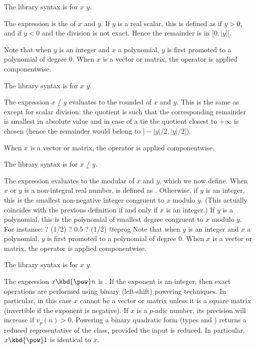The library syntax is  for $x$ \kbd{/} $y$.

\subseckbd{\bs} The expression  is the  of $x$ and $y$. If $y$ is a real scalar, this is defined as
 if $y > 0$, and  if $y < 0$ and
the division is not exact. Hence the remainder 
is in $[0, |y|[$.

Note that when $y$ is an integer and $x$ a polynomial, $y$ is first promoted
to a polynomial of degree $0$. When $x$ is a vector or matrix, the operator
is applied componentwise.

The library syntax is 
for $x$ \kbd{\bs} $y$.

\subseckbd{\bs/} The expression $x$ \b{/} $y$ evaluates to the rounded
 of $x$ and $y$. This is the same as 
except for scalar division: the quotient is such that the corresponding
remainder is smallest in absolute value and in case of a tie the quotient
closest to $+\infty$ is chosen (hence the remainder would belong to
$]{-}|y|/2, |y|/2]$).

When $x$ is a vector or matrix, the operator is applied componentwise.

The library syntax is 
for $x$ \b{/} $y$.

\subseckbd{\%} The expression  evaluates to the modular
 of $x$ and $y$, which we now define. When $x$ or $y$
is a non-integral real number,  is defined as . Otherwise, if $y$ is an integer, this is the smallest
non-negative integer congruent to $x$ modulo $y$. (This actually coincides with
the previous definition if and only if $x$ is an integer.) If $y$ is a
polynomial, this is the polynomial of smallest degree congruent to $x$ modulo
$y$. For instance:
\bprog
? (1/2) %
? 0.5 %
? (1/2) %
@eprog
Note that when $y$ is an integer and $x$ a polynomial, $y$ is first promoted
to a polynomial of degree $0$. When $x$ is a vector or matrix, the operator
is applied componentwise.

The library syntax is 
for $x$ \kbd{\%} $y$.

\subseckbd{\pow} The expression $x\hbox{\kbd{\pow}}n$ is .
If the exponent is an integer, then exact operations are performed using
binary (left-shift) powering techniques. In particular, in this case $x$
cannot be a vector or matrix unless it is a square matrix (invertible
if the exponent is negative). If $x$ is a $p$-adic number, its
precision will increase if $v_p(n) > 0$. Powering a binary quadratic form
(types  and ) returns a reduced representative of the
class, provided the input is reduced. In particular, $x\hbox{\kbd{\pow}}1$ is
identical to $x$.

